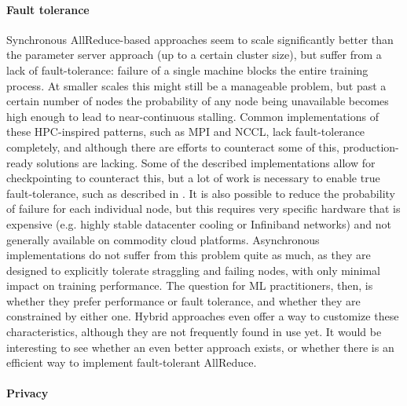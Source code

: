\paragraph{Fault tolerance}

Synchronous AllReduce-based approaches seem to scale significantly better than the parameter server approach (up to a certain cluster size), but suffer from a lack of fault-tolerance: failure of a single machine blocks the entire training process. At smaller scales this might still be a manageable problem, but past a certain number of nodes the probability of any node being unavailable becomes high enough to lead to near-continuous stalling. Common implementations of these HPC-inspired patterns, such as MPI and NCCL, lack fault-tolerance completely, and although there are efforts to counteract some of this, production-ready solutions are lacking. Some of the described implementations allow for checkpointing to counteract this, but a lot of work is necessary to enable true fault-tolerance, such as described in \citet{Amatya2017}. It is also possible to reduce the probability of failure for each individual node, but this requires very specific hardware that is expensive (e.g. highly stable datacenter cooling or Infiniband networks) and not generally available on commodity cloud platforms.
Asynchronous implementations do not suffer from this problem quite as much, as they are designed to explicitly tolerate straggling and failing nodes, with only minimal impact on training performance. The question for ML practitioners, then, is whether they prefer performance or fault tolerance, and whether they are constrained by either one. Hybrid approaches even offer a way to customize these characteristics, although they are not frequently found in use yet. It would be interesting to see whether an even better approach exists, or whether there is an efficient way to implement fault-tolerant AllReduce.

\paragraph{Privacy}

